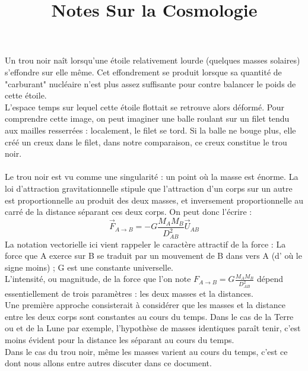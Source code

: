 \documentclass[french, 12pt]{article}
\newcommand{\navy}{\color{navy}}
\newcommand{\bk}{\color{black}}
\begin{document}
\title{\navy \textbf{Notes Sur la Cosmologie}} \bk

\date{}
\maketitle

\thispagestyle{fancy}

Un trou noir naît lorsqu'une étoile relativement lourde (quelques masses solaires) s'effondre sur elle même. Cet effondrement se produit lorsque sa quantité de "carburant" nucléaire n'est plus assez suffisante pour contre balancer le poids de cette étoile.\\
L'espace temps sur lequel cette étoile flottait se retrouve alors déformé. Pour comprendre cette image, on peut imaginer une balle roulant sur un filet tendu aux mailles resserrées : localement, le filet se tord. Si la balle ne bouge plus, elle créé un creux dans le filet, dans notre comparaison, ce creux constitue le trou noir.\\\\
Le trou noir est vu comme une singularité : un point où la masse est énorme. La loi d'attraction gravitationnelle stipule que l'attraction d'un corps sur un autre est proportionnelle au produit des deux masses, et inversement proportionnelle au carré de la distance séparant ces deux corps. On peut donc l'écrire :
\begin{equation}
\vec{F}_{A \rightarrow B} = -G \frac{M_A M_B}{D^2	_{AB}} \vec{U}_{AB}
\end{equation}
 \noindent La notation vectorielle ici vient rappeler le caractère attractif de la force : La force que A exerce sur B se traduit par un mouvement de B dans vers A (d' où le signe moins) ; G est une constante universelle.\\
 L'intensité, ou magnitude, de la force que l'on note $F_{A\rightarrow B} = G \frac{M_A M_B}{D^2	_{AB}}$ dépend essentiellement de trois paramètres : les deux masses et la distances. \\
 Une première approche consisterait à considérer que les masses et la distance entre les deux corps sont constantes au cours du temps. Dans le cas de la Terre ou et de la Lune par exemple, l'hypothèse de masses identiques paraît tenir, c'est moins évident pour la distance les séparant au cours du temps.\\
 Dans le cas du trou noir, même les masses varient au cours du temps, c'est ce dont nous allons entre autres discuter dans ce document.
\end{document}
